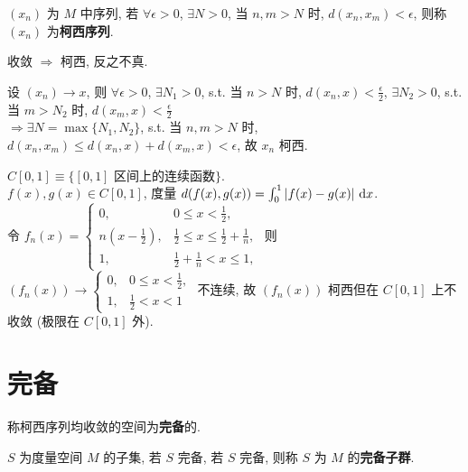 \documentclass{note}
\begin{document}
\begin{df}[柯西序列]
    $(x_n)$ 为 $M$ 中序列, 若 $\forall\epsilon>0$, $\exists N>0$, 当 $n,m>N$ 时, $d(x_n,x_m)<\epsilon$, 则称 $(x_n)$ 为\textbf{柯西序列}.
\end{df}

收敛 $\Longrightarrow$ 柯西, 反之不真.
\begin{pf}
    设 $(x_n)\rightarrow x$, 则 $\forall\epsilon>0$, $\exists N_1>0$, s.t. 当 $n>N$ 时, $d(x_n,x)<\frac{\epsilon}{2}$, $\exists N_2>0$, s.t. 当 $m>N_2$ 时, $d(x_m,x)<\frac{\epsilon}{2}$\\
    $\Longrightarrow\exists N=\max\{N_1,N_2\}$, s.t. 当 $n,m>N$ 时, $d(x_n,x_m)\leq d(x_n,x)+d(x_m,x)<\epsilon$, 故 $x_n$ 柯西.
\end{pf}

\begin{eg}
    $C[0,1]\equiv\{[0,1]\text{ 区间上的连续函数}\}$.\\
    $f(x),g(x)\in C[0,1]$, 度量 $d(f(x),g(x))=\int_0^1\left\lvert f(x)-g(x)\right\rvert\,\mathrm{d}x$.\\
    令 $f_n(x)=\left\{\begin{array}{ll}
        0,&0\leq x<\frac{1}{2},\\
        n(x-\frac{1}{2}),&\frac{1}{2}\leq x\leq\frac{1}{2}+\frac{1}{n},\\
        1,&\frac{1}{2}+\frac{1}{n}<x\leq 1,
    \end{array}\right.$ 则 $(f_n(x))\rightarrow\left\{\begin{array}{ll}
        0,&0\leq x<\frac{1}{2},\\
        1,&\frac{1}{2}<x<1
    \end{array}\right.$ 不连续, 故 $(f_n(x))$ 柯西但在 $C[0,1]$ 上不收敛 (极限在 $C[0,1]$ 外).
\end{eg}

\section{完备}
\begin{df}[完备]
    称柯西序列均收敛的空间为\textbf{完备}的.
\end{df}

\begin{df}[完备子集]
    $S$ 为度量空间 $M$ 的子集, 若 $S$ 完备, 若 $S$ 完备, 则称 $S$ 为 $M$ 的\textbf{完备子群}.
\end{df}
\end{document}
